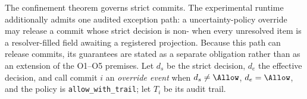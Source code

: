 

The confinement theorem governs strict \Allow{} commits. The experimental
runtime additionally admits one audited exception path: a uncertainty-policy
override may release a commit whose strict decision is non-\Allow{} when
every unresolved item is a resolver-filled field awaiting a registered
projection. Because this path can release commits, its guarantees are stated
as a separate obligation rather than as an extension of the O1--O5 premises.
Let $d_s$ be the strict decision, $d_e$ the effective decision, and call
commit $i$ an \emph{override event} when $d_s\neq\Allow$, $d_e=\Allow$, and
the policy is \texttt{allow\_with\_trail}; let $T_i$ be its audit trail.

